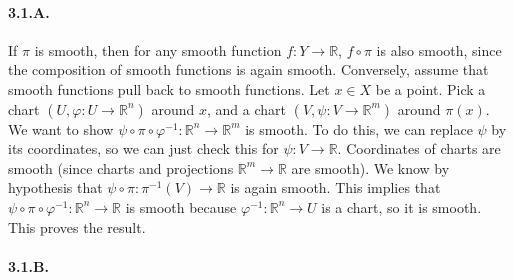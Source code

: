 \documentclass{article}
\newcommand{\R}{\mathbb{R}}
\begin{document}
\paragraph{3.1.A.} If $\pi$ is smooth, then for any smooth function $f : Y \to \R$, $f \circ \pi$ is also smooth, since the composition of smooth functions is again smooth. Conversely, assume that smooth functions pull back to smooth functions. Let $x \in X$ be a point. Pick a chart $(U,\varphi : U \to \R^n)$ around $x$, and a chart $(V,\psi : V \to \R^m)$ around $\pi(x)$. We want to show $\psi \circ \pi \circ \varphi^{-1} : \R^n \to \R^m$ is smooth. To do this, we can replace $\psi$ by its coordinates, so we can just check this for $\psi : V \to \R$. Coordinates of charts are smooth (since charts and projections $\R^m \to \R$ are smooth). We know by hypothesis that $\psi \circ \pi : \pi^{-1}(V) \to \R$ is again smooth. This implies that $\psi \circ \pi \circ \varphi^{-1} : \R^n \to \R$ is smooth because $\varphi^{-1} : \R^n\to U$ is a chart, so it is smooth. This proves the result.

\paragraph{3.1.B.} 
\end{document}
